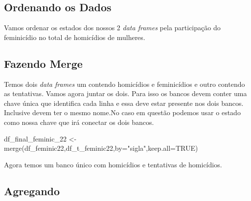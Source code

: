 \documentclass[
  letterpaper,
  DIV=11,
  numbers=noendperiod]{scrreprt}
\newenvironment{Shaded}{\begin{snugshade}}{\end{snugshade}}
\newcommand{\AttributeTok}[1]{\textcolor[rgb]{0.40,0.45,0.13}{#1}}
\newcommand{\ConstantTok}[1]{\textcolor[rgb]{0.56,0.35,0.01}{#1}}
\newcommand{\FunctionTok}[1]{\textcolor[rgb]{0.28,0.35,0.67}{#1}}
\newcommand{\NormalTok}[1]{\textcolor[rgb]{0.00,0.23,0.31}{#1}}
\newcommand{\OtherTok}[1]{\textcolor[rgb]{0.00,0.23,0.31}{#1}}
\newcommand{\SpecialCharTok}[1]{\textcolor[rgb]{0.37,0.37,0.37}{#1}}
\newcommand{\StringTok}[1]{\textcolor[rgb]{0.13,0.47,0.30}{#1}}
\begin{document}
\subsection{Ordenando os Dados}\label{ordenando-os-dados}

Vamos ordenar os estados dos nossos 2 \emph{data frames} pela
participação do feminicídio no total de homicídios de mulheres.

\begin{Shaded}
\end{Shaded}

\subsection{Fazendo Merge}\label{fazendo-merge}

Temos dois \emph{data frames} um contendo homicídios e feminicídios e
outro contendo as tentativas. Vamos agora juntar os dois. Para isso os
bancos devem conter uma chave única que identifica cada linha e essa
deve estar presente nos dois bancos. Inclusive devem ter o mesmo nome.No
caso em questão podemos usar o estado como nossa chave que irá conectar
os dois bancos.

\begin{Shaded}
\begin{Highlighting}[]
\NormalTok{df\_final\_feminic\_22 }\OtherTok{\textless{}{-}} \FunctionTok{merge}\NormalTok{(df\_feminic22,df\_t\_feminic22,}\AttributeTok{by=}\StringTok{"sigla"}\NormalTok{,}\AttributeTok{keep.all=}\ConstantTok{TRUE}\NormalTok{)}
\end{Highlighting}
\end{Shaded}

Agora temos um banco único com homicídios e tentativas de homicídios.

\subsection{Agregando}\label{agregando}
\end{document}
